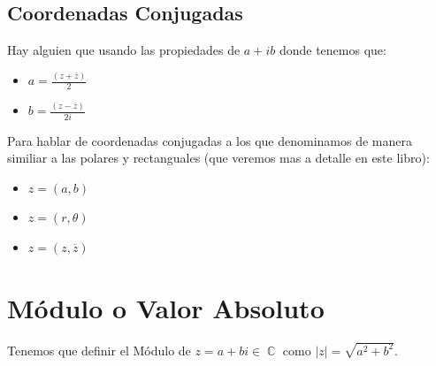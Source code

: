 \documentclass[12pt, fleqn]{report}                             %
\newcommand \Over               {\overline}                     %
\theoremstyle{break}                                            %
\DeclareMathOperator \Complexs     {\mathbb{C}}                 %
\begin{document}
            \clearpage
            \subsection{Coordenadas Conjugadas}

                Hay alguien que usando las propiedades de $a + ib$
                donde tenemos que:
                \begin{itemize}
                    \item $a = \frac{(z + \Over{z})}{2}$
                    \item $b = \frac{(z - \Over{z})}{2i}$
                \end{itemize}

                Para hablar de coordenadas conjugadas a los que denominamos
                de manera similiar a las polares y rectanguales (que veremos
                mas a detalle en este libro):
                \begin{itemize}
                    \item $z = (a, b)$
                    \item $z = (r, \theta)$
                    \item $z = (z, \Over{z})$
                \end{itemize}







        \clearpage
        \section{Módulo o Valor Absoluto}
            Tenemos que definir el Módulo de $z = a+bi \in \Complexs$ como $|z| = \sqrt{a^2 + b^2}$.
\end{document}
